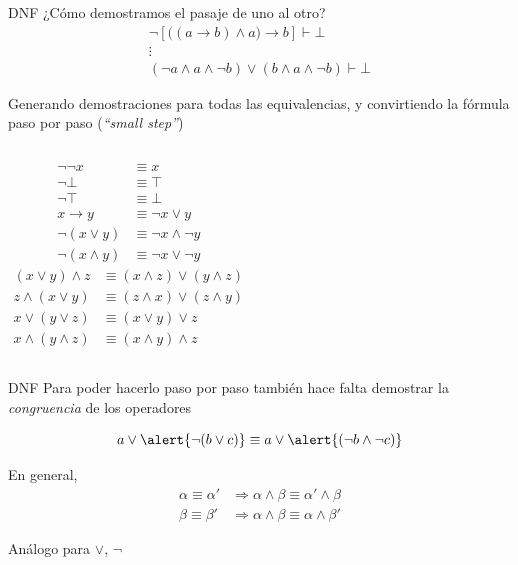 \documentclass[xcolor={dvipsnames},spanish]{beamer}
\begin{document}
\begin{frame}{DNF}
    ¿Cómo demostramos el pasaje de uno al otro?
    \begin{gather*}
        \neg [ \big( (a \to b) \wedge a \big) \to b ] \vdash \bot\\
        \vdots\\
        (\neg a \wedge a \wedge \neg b) \vee (b \wedge a \wedge \neg b) \vdash \bot
    \end{gather*}

    Generando demostraciones para todas las equivalencias, y convirtiendo la fórmula paso por paso (\textit{``small step''})
    \begin{columns}
        \begin{align*}
        \neg\neg x &\equiv x\\
        \neg \bot &\equiv \top\\
        \neg \top &\equiv \bot\\
        x \to y &\equiv \neg x \vee y\\
        \neg(x \vee y) &\equiv \neg x \wedge \neg y\\
        \neg(x \wedge y) &\equiv \neg x \vee \neg y
    \end{align*}
        \begin{align*}
            (x \vee y) \wedge z &\equiv (x \wedge z) \vee (y \wedge z)\\
            z \wedge (x \vee y) &\equiv (z \wedge x) \vee (z \wedge y)\\
            x \vee (y \vee z) &\equiv (x \vee y) \vee z\\
            x \wedge (y \wedge z) &\equiv (x \wedge y) \wedge z
        \end{align*}
    \end{columns}
\end{frame}

\begin{frame}{DNF}
    Para poder hacerlo paso por paso también hace falta demostrar la \textit{congruencia} de los operadores

    \[
        a \vee \alert{\neg (b \vee c)}
        \equiv
        a \vee \alert{(\neg b \wedge \neg c)}
    \]

    En general,
    \begin{align*}
        \alpha \equiv \alpha' &\Rightarrow \alpha \wedge \beta \equiv \alpha' \wedge \beta\\
        \beta \equiv \beta' &\Rightarrow \alpha \wedge \beta \equiv \alpha \wedge \beta'
    \end{align*}

    Análogo para $\vee$, $\neg$
\end{frame}
\end{document}
